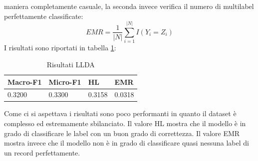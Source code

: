 \documentclass[technote]{IEEEtran}
\begin{document}
maniera completamente casuale, la seconda invece verifica il numero
di multilabel perfettamente classificate:\\
\begin{equation}
EMR = \frac{1}{|N|}\sum_{i=1}^{|N|}I(Y_i = Z_i)
\end{equation}
I risultati sono riportati in tabella \ref{t_res_llda}:\\
\begin{table}[H]
\centering
\caption{Risultati LLDA}
\begin{tabular}{|l|l|l|l|}
\hline
\textbf{Macro-F1} & \textbf{Micro-F1} & \textbf{HL} & \textbf{EMR} \\ \hline
0.3200         & 0.3300         & 0.3158      & 0.0318       \\ \hline
\end{tabular}
\label{t_res_llda}
\end{table}
Come ci si aspettava i risultati sono poco performanti in quanto il dataset
è complesso ed estremamente sbilanciato.
Il valore HL mostra che il modello \`e in grado di classificare le label
con un buon grado di correttezza. Il valore EMR mostra invece che
il modello non \`e in grado di classificare quasi nessuna label di un record perfettamente. 
\end{document}
